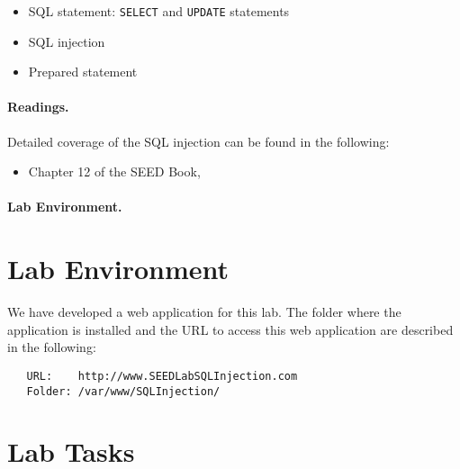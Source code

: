 \begin{itemize}[noitemsep]
\item SQL statement: \texttt{SELECT} and \texttt{UPDATE} statements
\item SQL injection
\item Prepared statement
\end{itemize}



\paragraph{Readings.}
Detailed coverage of the SQL injection can be found in the following:

\begin{itemize}
\item Chapter 12 of the SEED Book, \seedbook
\end{itemize}

\paragraph{Lab Environment.} \seedenvironmentAB




\section{Lab Environment}


We have developed a web application for this lab. The folder where the 
application is installed and the URL to access this web application are 
described in the following: 

\begin{lstlisting}
   URL:    http://www.SEEDLabSQLInjection.com
   Folder: /var/www/SQLInjection/
\end{lstlisting}
 


\newcommand{\urlorurls}{URL }
\newcommand{\urlisorurlsare}{URL is }





\section{Lab Tasks}

